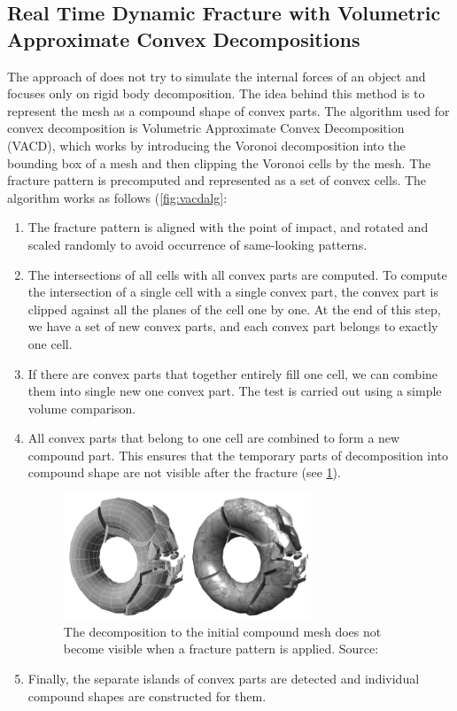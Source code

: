\subsection{Real Time Dynamic Fracture
with Volumetric Approximate Convex Decompositions}
\label{sec:RTDF}
The approach of \citet{nvidia} does not try to simulate the internal forces of an object and focuses only on rigid body decomposition. The idea behind this method is to represent the mesh as a compound shape of convex parts. The algorithm used for convex decomposition is Volumetric Approximate Convex Decomposition (VACD), which works by introducing the Voronoi decomposition into the bounding box of a mesh and then clipping the Voronoi cells by the mesh. The fracture pattern is precomputed and represented as a set of convex cells. The algorithm works as follows (\cref{fig:vacdalg}:
\begin{enumerate}
\item The fracture pattern is aligned with the point of impact, and rotated and scaled randomly to avoid occurrence of same-looking patterns.
\item The intersections of all cells with all convex parts are computed. To compute the intersection of a single cell with a single convex part, the convex part is clipped against all the planes of the cell one by one. 
At the end of this step, we have a set of new convex parts, and each convex part belongs to exactly one cell.
\item If there are convex parts that together entirely fill one cell, we can combine them into single new one convex part. The test is carried out using a simple volume comparison.
\item All convex parts that belong to one cell are combined to form a new compound part. This ensures that the temporary parts of decomposition into compound shape are not visible after the fracture (see \cref{fig:vacdfracture}).
\begin{figure}
        \centering
        \includegraphics[width=0.7\textwidth]{img/vacdfracture}
        \caption{The decomposition to the
initial compound mesh does not become visible when a fracture
pattern is applied. Source: \citet{nvidia}}
        \label{fig:vacdfracture}
\end{figure}
\item Finally, the separate islands of convex parts are detected and individual compound shapes are constructed for them.
\end{enumerate}


